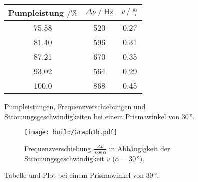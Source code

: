 \begin{figure}
    \begin{subtable}{0.43\textwidth}
        \centering
       \begin{tabular}{c c c}
        \toprule 
        {Pumpleistung $\mathbin{/}\%$} & {$\Delta \nu \mathbin{/} \unit{\hertz}$} & {$v \mathbin{/} \unit{\frac{\meter}{\second}}$}  \\
        \midrule 
                75.58   &     520  & 0.27 \\
                81.40   &     596  & 0.31 \\
                87.21   &     670  & 0.35 \\
                93.02   &     564  & 0.29 \\
                100.0   &     868  & 0.45 \\
        \bottomrule
       \end{tabular}
       \caption{Pumpleistungen, Frequenzverschiebungen und Strömungsgeschwindigkeiten bei einem Prismawinkel von $30 \,°$.}
        \label{tab:1winkel2}  
    \end{subtable}
    \begin{subfigure}{0.57\textwidth} 
        \centering
        \texttt{[image: build/Graph1b.pdf]} %
        \caption{Frequenzverschiebung $\frac{\Delta \nu}{\cos\alpha}$ in Abhängigkeit der Strömungsgeschwindigkeit $v$ ($\alpha = 30 \,°$).}  
        \label{fig:graph1b}
        \qquad
    \end{subfigure}
    \caption{Tabelle und Plot bei einem Prismawinkel von $30 \,°$.} 
\end{figure}  

